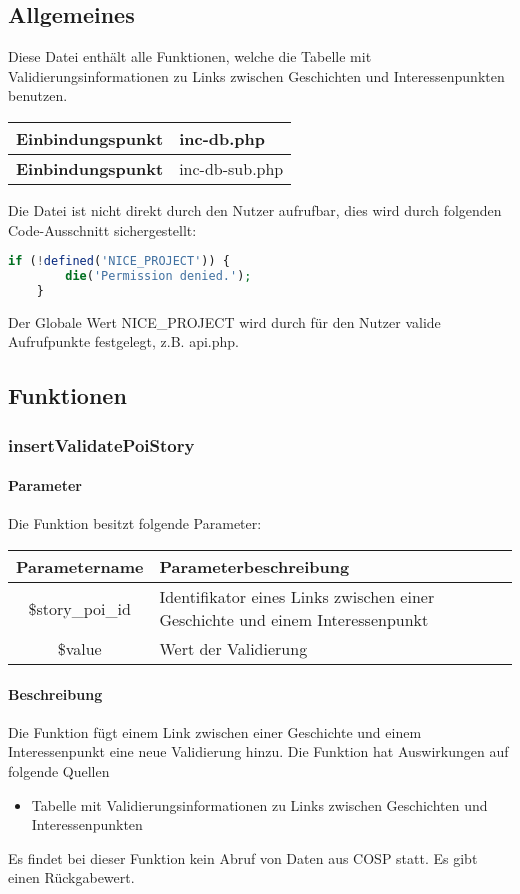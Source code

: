 \subsection{Allgemeines} Diese Datei enthält alle Funktionen, welche die Tabelle mit Validierungsinformationen zu Links zwischen Geschichten und Interessenpunkten benutzen.
\begin{table}[H]
	\begin{tabular}{|c|p{11cm}|}
		\hline
		\textbf{Einbindungspunkt} & inc-db.php \\ \hline
		\textbf{Einbindungspunkt} & inc-db-sub.php \\ \hline
	\end{tabular}
\end{table}
Die Datei ist nicht direkt durch den Nutzer aufrufbar, dies wird durch folgenden Code-Ausschnitt sichergestellt:
\begin{lstlisting}[language=php]
	if (!defined('NICE_PROJECT')) {
		die('Permission denied.');
	}
\end{lstlisting}
Der Globale Wert {\glqq NICE\_PROJECT\grqq} wird durch für den Nutzer valide Aufrufpunkte festgelegt, z.B. {\glqq api.php\grqq}.
\newpage
\subsection{Funktionen}
\subsubsection{insertValidatePoiStory}
\paragraph{Parameter} Die Funktion besitzt folgende Parameter:
\begin{table}[H]
	\begin{tabular}{|c|p{11cm}|}
		\hline
		\textbf{Parametername} & \textbf{Parameterbeschreibung} \\ \hline
		\$story\_poi\_id & Identifikator eines Links zwischen einer Geschichte und einem Interessenpunkt \\ \hline
		\$value        & Wert der Validierung \\ \hline
	\end{tabular}
\end{table}
\paragraph{Beschreibung} Die Funktion fügt einem Link zwischen einer Geschichte und einem Interessenpunkt eine neue Validierung hinzu. Die Funktion hat Auswirkungen auf folgende Quellen
\begin{itemize}
	\item Tabelle mit Validierungsinformationen zu Links zwischen Geschichten und Interessenpunkten
\end{itemize}
Es findet bei dieser Funktion kein Abruf von Daten aus {\glqq COSP\grqq} statt. Es gibt einen Rückgabewert.
